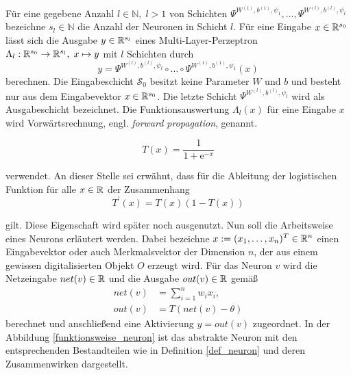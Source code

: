 \begin{defi}
    Für eine gegebene Anzahl $l \in \mathbb{N}, \; l>1$ von Schichten $\Psi^{W^{(1)},b^{(1)},\psi_{1}}, \ldots, \Psi^{W^{(l)},b^{(l)},\psi_{l}}$ bezeichne $s_l \in \mathbb{N}$ die Anzahl der Neuronen in Schicht $l$. Für eine Eingabe $x \in \mathbb{R}^{s_0}$ lässt sich die Ausgabe $y \in \mathbb{R}^{s_l}$ eines Multi-Layer-Perzeptron  $\Lambda_l: \mathbb{R}^{s_0} \rightarrow \mathbb{R}^{s_l}, \; x \mapsto y$ mit $l$ Schichten durch
    \[
        y=\Psi^{W^{(l)},b^{(l)},\psi_{l}} \circ \ldots \circ \Psi^{W^{(1)},b^{(1)},\psi_{1}}(x)
    \]
    berechnen. Die Eingabeschicht $\mathcal{S}_0$ besitzt keine Parameter $W$ und $b$ und besteht nur aus dem Eingabevektor $x \in \mathbb{R}^{s_0}$. Die letzte Schicht $\Psi^{W^{(l)},b^{(l)},\psi_{l}}$ wird als Ausgabeschicht bezeichnet. Die Funktionsauswertung $\Lambda_l(x)$ für eine Eingabe $x$ wird Vorwärtsrechnung, engl. \textit{forward propagation}, genannt.
\end{defi}
\begin{equation*}
    \label{logf}
    T(x)=\frac{1}{1+\mathrm{e}^{-x}}
\end{equation*}

verwendet. An dieser Stelle sei erwähnt, dass für die Ableitung der logistischen Funktion für alle $x \in \mathbb{R}$ der Zusammenhang
\begin{equation*}
    \label{difflogf}
    T^{\prime} (x)=T(x)(1-T(x)) 
\end{equation*}

gilt. Diese Eigenschaft wird später noch ausgenutzt. Nun soll die Arbeitsweise eines Neurons erläutert werden. Dabei bezeichne $x:=(x_1, \ldots, x_n)^{T} \in \mathbb{R}^{n}$ einen Eingabevektor oder auch Merkmalsvektor der Dimension $n$, der aus einem gewissen digitalisierten Objekt $O$ erzeugt wird. Für das Neuron $v$ wird die Netzeingabe $net(v) \in \mathbb{R}$ und die Ausgabe $out(v) \in \mathbb{R}$ gemäß
\begin{align*}
    \label{neuronoutput1}
    net(v) &= \sum_{i=1}^n w_i x_i, \\
    out(v) &= T(net(v)-\theta)
\end{align*} 
berechnet und anschließend eine Aktivierung $y=out(v)$ zugeordnet. In der Abbildung \ref{funktionsweise_neuron} ist das abstrakte Neuron mit den entsprechenden Bestandteilen wie in Definition \ref{def_neuron} und deren Zusammenwirken dargestellt.

